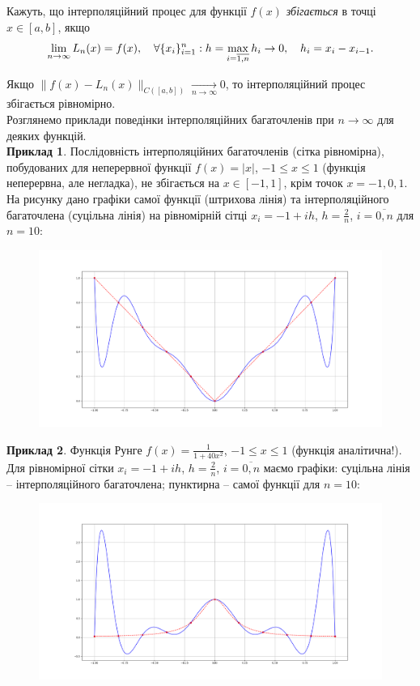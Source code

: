 Кажуть, що інтерполяційний процес для функції $f(x)$ \textit{збігається} в точці $x\in[a,b]$, якщо 
\[ \displaystyle\lim\limits_{n\to\infty} L_n(x) = f(x), \quad \forall \{x_i\}_{i=1}^n: h = \displaystyle\max\limits_{i=\overline{1,n}} h_i \to 0, \quad h_i = x_i - x_{i-1}.\]

Якщо $\|f(x)-L_n(x)\|_{C([a,b])} \xrightarrow[n\to\infty]{}0$, то інтерполяційний процес збігається рівномірно. \\

Розглянемо приклади поведінки інтерполяційних багаточленів при $n\to\infty$ для деяких функцій. \\

\textbf{Приклад 1}. Послідовність інтерполяційних багаточленів (сітка рівномірна), побудованих для неперервної функції $f (x) = |x|$, $-1\le x\le1$ (функція неперервна, але негладка), не збігається на $x \in [-1,1]$, крім точок $x=-1,0,1$. \\

На рисунку дано графіки самої функції (штрихова лінія) та інтерполяційного багаточлена (суцільна лінія) на рівномірній сітці $x_i = -1 + i h$, $h = \frac2n$, $i=\overline{0,n}$ для $n = 10$:

\begin{figure}[H]
    \centering
    \includegraphics[width=\linewidth]{mal-4.png}
\end{figure}

\textbf{Приклад 2}. Функція Рунге $f(x) = \frac{1}{1+40x^2}$, $-1\le x\le1$ (функція аналітична!). Для рівномірної сітки $x_i = -1 + i h$, $h = \frac2n$, $i=\overline{0,n}$ маємо графіки: суцільна лінія -- інтерполяційного багаточлена; пунктирна -- самої функції для $n = 10$:

\begin{figure}[H]
    \centering
    \includegraphics[width=\linewidth]{mal-5.png}
\end{figure}

